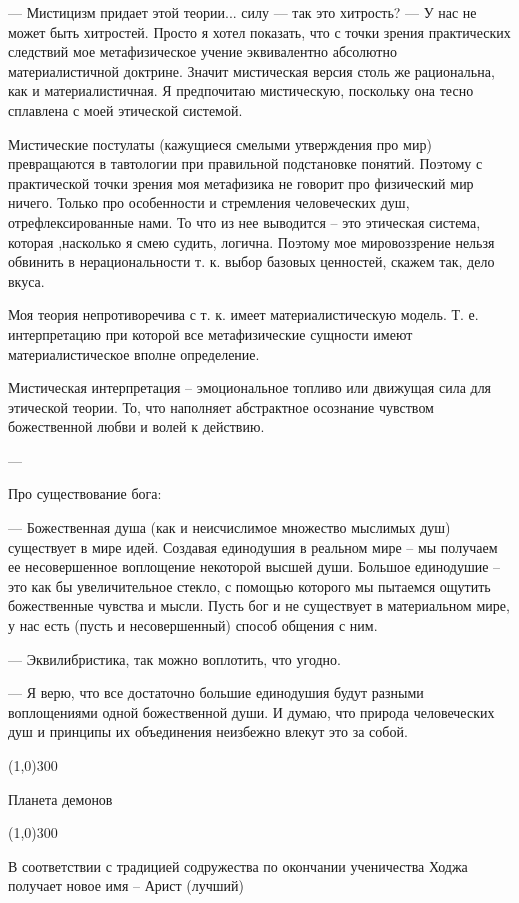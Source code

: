 \documentclass[12pt,a4paper]{article}
\newcommand{\sep}{
	\begin{center}
		\line(1,0){300}
	\end{center}
}
\begin{document}
--- Мистицизм придает этой теории... силу
--- так это хитрость?
--- У нас не может быть хитростей. Просто я хотел показать, что с точки зрения практических следствий мое метафизическое учение эквивалентно абсолютно материалистичной доктрине. Значит мистическая версия столь же рациональна, как и материалистичная. Я предпочитаю мистическую, поскольку она тесно сплавлена с моей этической системой.

Мистические постулаты (кажущиеся смелыми утверждения про мир) превращаются в тавтологии при правильной подстановке понятий. Поэтому с практической точки зрения моя метафизика не говорит про физический мир ничего. Только про особенности и стремления человеческих душ, отрефлексированные нами. То что из нее выводится -- это этическая система, которая ,насколько я смею судить, логична. Поэтому мое мировоззрение нельзя обвинить в нерациональности т. к. выбор базовых ценностей, скажем так, дело вкуса.

Моя теория непротиворечива с т. к. имеет материалистическую модель. Т. е. интерпретацию при которой все метафизические сущности имеют материалистическое вполне определение.

Мистическая интерпретация -- эмоциональное топливо или движущая сила для этической теории. То, что наполняет абстрактное осознание чувством божественной любви и волей к действию.

---

Про существование бога:

--- Божественная душа (как и неисчислимое множество мыслимых душ) существует в мире идей. Создавая единодушия в реальном мире -- мы получаем ее несовершенное воплощение некоторой высшей души. Большое единодушие -- это как бы увеличительное стекло, с помощью которого мы пытаемся ощутить божественные чувства и мысли. Пусть бог и не существует в материальном мире, у нас есть (пусть и несовершенный) способ общения с ним.

--- Эквилибристика, так можно воплотить, что угодно.

--- Я верю, что все достаточно большие единодушия будут разными воплощениями одной божественной души. И думаю, что природа человеческих душ и принципы их объединения неизбежно влекут это за собой.

\sep

Планета демонов

\sep

В соответствии с традицией содружества по окончании ученичества Ходжа получает новое имя -- Арист (лучший)
\end{document}
